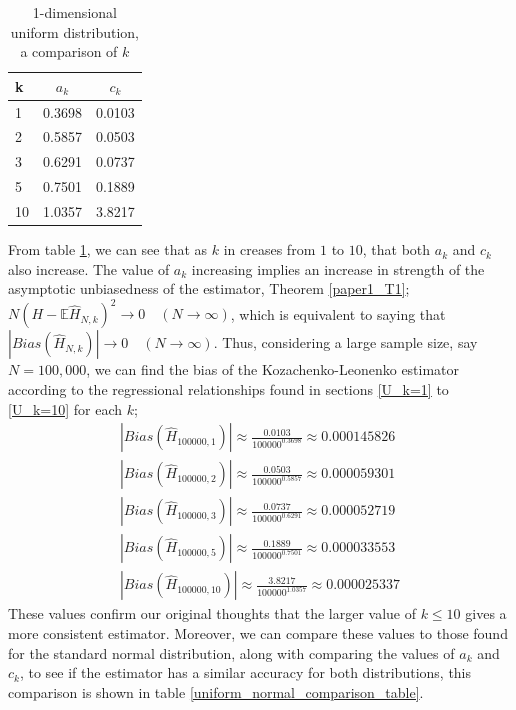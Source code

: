 \documentclass{article}
\begin{document}
\begin{table}
\caption{1-dimensional uniform distribution, a comparison of $k$} \label{uniform_k_comparison_table}
\begin{center}
\begin{tabular}{| l | c c|} 
\toprule
k & $a_{k}$ & $c_{k}$ \\
\midrule[1pt]
1 & 0.3698 & 0.0103 \\
2 & 0.5857 & 0.0503 \\
3 & 0.6291 & 0.0737 \\
5 & 0.7501 & 0.1889 \\
10 & 1.0357 &  3.8217 \\
\hline
\end{tabular}
\end{center}
\end{table}

From table \ref{uniform_k_comparison_table}, we can see that as $k$ in creases from $1$ to $10$, that both $a_{k}$ and $c_{k}$ also increase. The value of $a_{k}$ increasing implies an increase in strength of the asymptotic unbiasedness of the estimator, Theorem \ref{paper1_T1};  $N (H - \mathbb{E}{\hat{H}_{N, k}})^2 \to 0 \quad  (N \to \infty)$, which is equivalent to saying that $|Bias(\hat{H}_{N, k})| \to 0 \quad (N \to \infty)$. Thus, considering a large sample size, say $N=100,000$, we can find the bias of the Kozachenko-Leonenko estimator according to the regressional relationships found in sections \ref{U_k=1} to \ref{U_k=10} for each $k$;
\begin{gather*}
|Bias(\hat{H}_{100000, 1})| \approx  \frac{0.0103}{100000^{0.3698}}   \approx 0.000145826 \\
|Bias(\hat{H}_{100000, 2})| \approx  \frac{0.0503}{100000^{0.5857}}   \approx 0.000059301 \\
|Bias(\hat{H}_{100000, 3})| \approx  \frac{0.0737}{100000^{0.6291}}   \approx 0.000052719 \\
|Bias(\hat{H}_{100000, 5})| \approx  \frac{0.1889}{100000^{0.7501}}   \approx 0.000033553\\
|Bias(\hat{H}_{100000, 10})| \approx  \frac{3.8217}{100000^{1.0357}}  \approx 0.000025337
\end{gather*}
These values confirm our original thoughts that the larger value of $k \leq 10$ gives a more consistent estimator. Moreover, we can compare these values to those found for the standard normal distribution, along with comparing the values of $a_{k}$ and $c_{k}$, to see if the estimator has a similar accuracy for both distributions, this comparison is shown in table \ref{uniform_normal_comparison_table}.
\end{document}
